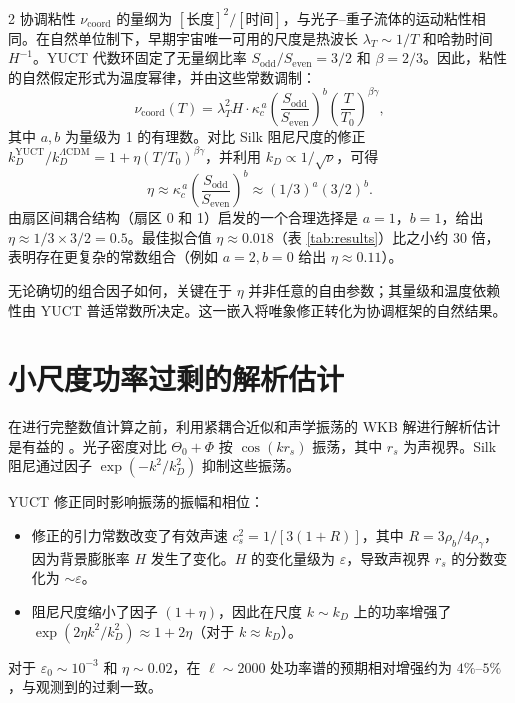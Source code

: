 \documentclass[11pt,a4paper]{article}
\begin{document}
\begin{multicols}{2}
		协调粘性 $\nu_{\mathrm{coord}}$ 的量纲为 $[\mathrm{长度}]^2/[\mathrm{时间}]$，与光子–重子流体的运动粘性相同。在自然单位制下，早期宇宙唯一可用的尺度是热波长 $\lambda_T \sim 1/T$ 和哈勃时间 $H^{-1}$。YUCT 代数环固定了无量纲比率 $S_{\mathrm{odd}}/S_{\mathrm{even}} = 3/2$ 和 $\beta = 2/3$。因此，粘性的自然假定形式为温度幂律，并由这些常数调制：
		\begin{equation}
			\nu_{\mathrm{coord}}(T) = \lambda_T^2 H \cdot \kappa_c^{\,a} \left(\frac{S_{\mathrm{odd}}}{S_{\mathrm{even}}}\right)^b \left(\frac{T}{T_0}\right)^{\beta\gamma},
		\end{equation}
		其中 $a,b$ 为量级为 1 的有理数。对比 Silk 阻尼尺度的修正 $k_D^{\mathrm{YUCT}}/k_D^{\Lambda\mathrm{CDM}} = 1 + \eta (T/T_0)^{\beta\gamma}$，并利用 $k_D \propto 1/\sqrt{\nu}$，可得
		\begin{equation}
			\eta \approx \kappa_c^{\,a} \left(\frac{S_{\mathrm{odd}}}{S_{\mathrm{even}}}\right)^b \approx (1/3)^a (3/2)^b.
		\end{equation}
		由扇区间耦合结构（扇区 0 和 1）启发的一个合理选择是 $a=1$，$b=1$，给出 $\eta \approx 1/3 \times 3/2 = 0.5$。最佳拟合值 $\eta \approx 0.018$（表 \ref{tab:results}）比之小约 30 倍，表明存在更复杂的常数组合（例如 $a=2, b=0$ 给出 $\eta \approx 0.11$）。
		
		无论确切的组合因子如何，关键在于 $\eta$ 并非任意的自由参数；其量级和温度依赖性由 YUCT 普适常数所决定。这一嵌入将唯象修正转化为协调框架的自然结果。
		
		\section{小尺度功率过剩的解析估计}
		
		在进行完整数值计算之前，利用紧耦合近似和声学振荡的 WKB 解进行解析估计是有益的 \cite{Hu1995}。光子密度对比 $\Theta_0 + \Phi$ 按 $\cos(k r_s)$ 振荡，其中 $r_s$ 为声视界。Silk 阻尼通过因子 $\exp(-k^2/k_D^2)$ 抑制这些振荡。
		
		YUCT 修正同时影响振荡的振幅和相位：
		\begin{itemize}
			\item 修正的引力常数改变了有效声速 $c_s^2 = 1/[3(1+R)]$，其中 $R = 3\rho_b/4\rho_\gamma$，因为背景膨胀率 $H$ 发生了变化。$H$ 的变化量级为 $\varepsilon$，导致声视界 $r_s$ 的分数变化为 $\sim \varepsilon$。
			\item 阻尼尺度缩小了因子 $(1+\eta)$，因此在尺度 $k \sim k_D$ 上的功率增强了 $\exp(2\eta k^2/k_D^2) \approx 1 + 2\eta$（对于 $k \approx k_D$）。
		\end{itemize}
		对于 $\varepsilon_0 \sim 10^{-3}$ 和 $\eta \sim 0.02$，在 $\ell \sim 2000$ 处功率谱的预期相对增强约为 $4\%$--$5\%$，与观测到的过剩一致。
		

\end{multicols}
\end{document}
